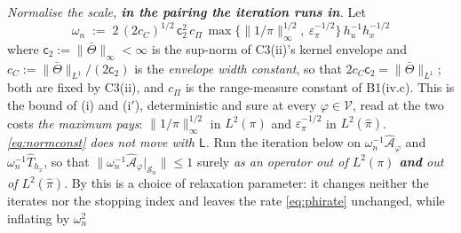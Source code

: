\begin{definition}
\emph{Normalise the scale, \textbf{in the pairing the iteration runs in}.} Let
\begin{equation}\label{eq:normconst}
\omega_n\;:=\;2\,(2c_C)^{1/2}\,\mathsf c_2^{2}\,c_\Pi\,
\max\big\{\|1/\pi\|_\infty^{1/2},\ \varepsilon_\pi^{-1/2}\big\}\,h_u^{-1}h_x^{-1/2}
\end{equation}
where $\mathsf c_2:=\|\bar\Theta\|_\infty<\infty$ is the sup-norm of C3(ii)'s kernel envelope and
$c_C:=\|\bar\Theta\|_{L^{1}}/(2\mathsf c_2)$ is the \emph{envelope width constant}, so that
$2c_C\mathsf c_2=\|\bar\Theta\|_{L^{1}}$; both are fixed by C3(ii), and $c_\Pi$ is the range-measure
constant of B1(iv.c).
This is
the bound of \textup{(i)} and \textup{(i$'$)}, deterministic and sure at
every $\varphi\in\mathcal V$, read at the two costs \emph{the maximum pays}:
$\|1/\pi\|_\infty^{1/2}$ in $L^{2}(\pi)$ and $\varepsilon_\pi^{-1/2}$ in $L^{2}(\hat\pi)$.
\emph{\eqref{eq:normconst} does not move with $\mathsf L$.}
Run the iteration below on $\omega_n^{-1}\hat{\mathcal A}_\varphi$ and
$\omega_n^{-1}\hat T_{h_x}$, so that $\|\omega_n^{-1}\hat{\mathcal A}_\varphi\vert_{\mathcal S_n}\|\le1$
surely \emph{as an operator out of $L^{2}(\pi)$ \textbf{and} out of $L^{2}(\hat\pi)$}. By
 this is a choice of relaxation parameter: it changes neither the iterates nor
the stopping index and leaves the rate \eqref{eq:phirate} unchanged, while inflating by $\omega_n^{2}$

\end{definition}
